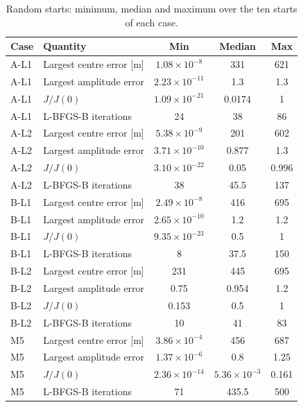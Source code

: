 \begin{table}[htbp]
\centering
\caption{Random starts: minimum, median and maximum over the ten starts of each case.}
\label{tab:table_distributions}
\footnotesize
\begin{tabular}{llccc}
\toprule
Case & Quantity & Min & Median & Max \\
\midrule
A-L1 & Largest centre error [m] & $1.08\times 10^{-8}$ & 331 & 621 \\
A-L1 & Largest amplitude error & $2.23\times 10^{-11}$ & 1.3 & 1.3 \\
A-L1 & $J/J(0)$ & $1.09\times 10^{-21}$ & 0.0174 & 1 \\
A-L1 & L-BFGS-B iterations & 24 & 38 & 86 \\
A-L2 & Largest centre error [m] & $5.38\times 10^{-9}$ & 201 & 602 \\
A-L2 & Largest amplitude error & $3.71\times 10^{-10}$ & 0.877 & 1.3 \\
A-L2 & $J/J(0)$ & $3.10\times 10^{-22}$ & 0.05 & 0.996 \\
A-L2 & L-BFGS-B iterations & 38 & 45.5 & 137 \\
B-L1 & Largest centre error [m] & $2.49\times 10^{-8}$ & 416 & 695 \\
B-L1 & Largest amplitude error & $2.65\times 10^{-10}$ & 1.2 & 1.2 \\
B-L1 & $J/J(0)$ & $9.35\times 10^{-23}$ & 0.5 & 1 \\
B-L1 & L-BFGS-B iterations & 8 & 37.5 & 150 \\
B-L2 & Largest centre error [m] & 231 & 445 & 695 \\
B-L2 & Largest amplitude error & 0.75 & 0.954 & 1.2 \\
B-L2 & $J/J(0)$ & 0.153 & 0.5 & 1 \\
B-L2 & L-BFGS-B iterations & 10 & 41 & 83 \\
M5 & Largest centre error [m] & $3.86\times 10^{-4}$ & 456 & 687 \\
M5 & Largest amplitude error & $1.37\times 10^{-6}$ & 0.8 & 1.25 \\
M5 & $J/J(0)$ & $2.36\times 10^{-14}$ & $5.36\times 10^{-3}$ & 0.161 \\
M5 & L-BFGS-B iterations & 71 & 435.5 & 500 \\
\bottomrule
\end{tabular}
\end{table}
